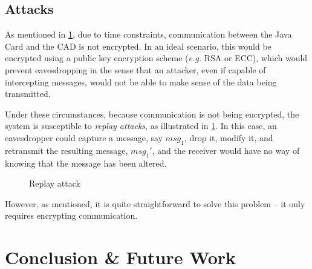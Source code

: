 \documentclass[a4paper, 11pt]{article}
\begin{document}
    \pagebreak

    \subsection{Attacks}\label{subsec:attacks}

    As mentioned in \cref{sec:conclusion}, due to time constraints, communication between the Java Card and the CAD is
    not encrypted.
    In an ideal scenario, this would be encrypted using a public key encryption scheme (\textit{e.g.} RSA or ECC), which
    would prevent eavesdropping in the sense that an attacker, even if capable of intercepting messages, would not be
    able to make sense of the data being transmitted.

    Under these circumstances, because communication is not being encrypted, the system is susceptible to \textit{replay
    attacks}, as illustrated in \cref{fig:replay-attack}.
    In this case, an eavesdropper could capture a message, say $msg_1$, drop it, modify it, and retransmit the resulting
    message, $msg_1'$, and the receiver would have no way of knowing that the message has been altered.

    \vspace{1.5\baselineskip}

    \begin{figure}[H]
        \centering
        \caption{Replay attack}
        \label{fig:replay-attack}
    \end{figure}

    \vspace{1.5\baselineskip}

    However, as mentioned, it is quite straightforward to solve this problem -- it only requires encrypting communication.

    \pagebreak


    \section{Conclusion \& Future Work} \label{sec:conclusion}
\end{document}
